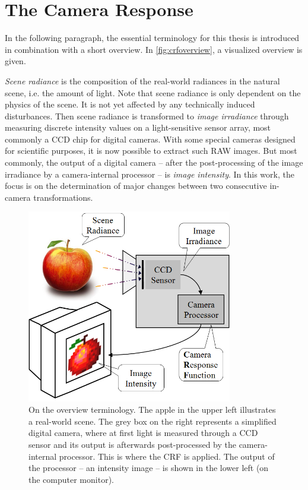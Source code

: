\chapter{The Camera Response}
\label{chap:crf}
In the following paragraph, the essential terminology for this thesis is introduced in combination with a short overview. In \autoref{fig:crfoverview}, a visualized overview is given.

\emph{Scene radiance} is the composition of the real-world radiances in the natural scene, \hbox{i.e.} the amount of light. Note that scene radiance is only dependent on the physics of the scene. It is not yet affected by any technically induced disturbances. Then scene radiance is transformed to \emph{image irradiance} through measuring discrete intensity values on a light-sensitive sensor array, most commonly a CCD chip for digital cameras. With some special cameras designed for scientific purposes, it is now possible to extract such RAW images. But most commonly, the output of a digital camera -- after the post-processing of the image irradiance by a camera-internal processor -- is \emph{image intensity}.
In this work, the focus is on the determination of major changes between two consecutive in-camera transformations.

\begin{figure}[p]
	\centering
	\includegraphics[width=0.8\textwidth]{images/crf_overview.png}
	\caption[On the overview terminology]{On the overview terminology. The apple in the upper left illustrates a real-world scene. The grey box on the right represents a simplified digital camera, where at first light is measured through a CCD sensor and its output is afterwards post-processed by the camera-internal processor. This is where the CRF is applied. The output of the processor -- an intensity image -- is shown in the lower left (on the computer monitor).}
	\label{fig:crfoverview}
\end{figure}

